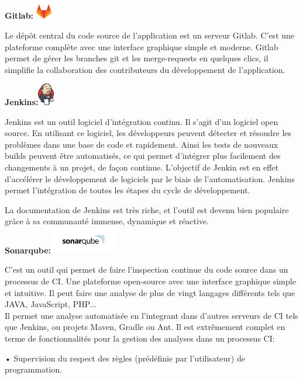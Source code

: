 \documentclass[12pt]{article}
\begin{document}
\textbf{Gitlab:} \includegraphics[width=7mm,scale=0.5]{diagrammes/gitlab.png}

Le dépôt central du code source de l’application est un serveur Gitlab. C’est une plateforme complète avec une interface graphique simple et moderne. Gitlab permet de gérer les branches git et les merge-requests en quelques clics, il simplifie la collaboration des contributeurs du développement de l’application. 

\textbf{Jenkins:}\includegraphics[width=7mm,scale=0.5]{diagrammes/jenkins.png}

Jenkins est un outil logiciel d’intégration continu. Il s’agit d’un logiciel open source. En utilisant ce logiciel, les développeurs peuvent détecter et résoudre les problèmes dans une base de code et rapidement. Ainsi les tests de nouveaux builds peuvent être automatisés, ce qui permet d’intégrer plus facilement des changements à un projet, de façon continue. L’objectif de Jenkin est en effet d’accélérer le développement de logiciels par le biais de l’automatisation. Jenkins permet l’intégration de toutes les étapes du cycle de développement.


La documentation de Jenkins est très riche, et l’outil est devenu bien populaire grâce à sa communauté immense, dynamique et réactive.\\
\textbf{Sonarqube:}\includegraphics[width=30mm,scale=0.5]{diagrammes/sonarqube.png}

C’est un outil qui permet de faire l’inspection continue du code source dans un processus de CI. Une plateforme open-source avec une interface graphique simple et intuitive. Il peut faire une analyse de plus de vingt langages différents tels que JAVA, JavaScript, PHP...\\
Il permet une analyse automatisée en l’integrant dans d’autres serveurs de CI tels que Jenkins, ou projets Maven, Gradle ou Ant. Il est extrêmement complet en terme de fonctionnalités pour la gestion des analyses dans un processus CI:

• Supervision du respect des règles (prédéfinie par l’utilisateur) de programmation.
\end{document}
